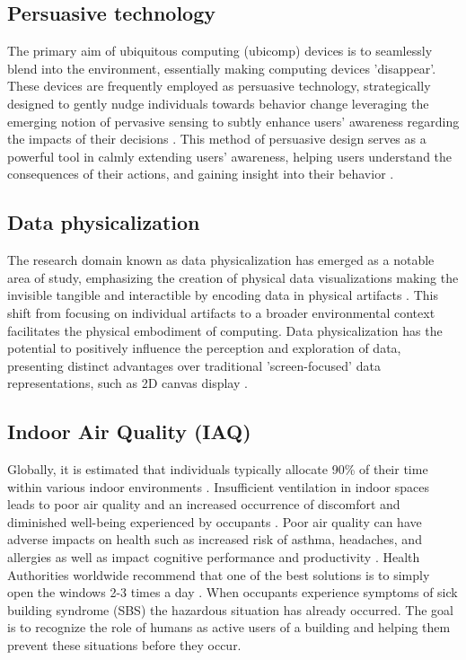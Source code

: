 \subsection{Persuasive technology}

The primary aim of ubiquitous computing (ubicomp) devices is to seamlessly blend into the environment, essentially making computing devices 'disappear'\cite{weiser}. These devices are frequently employed as persuasive technology, strategically designed to gently nudge individuals towards behavior change leveraging the emerging notion of pervasive sensing to subtly enhance users' awareness regarding the impacts of their decisions \cite{twinkly}. This method of persuasive design serves as a powerful tool in calmly extending users' awareness, helping users understand the consequences of their actions, and gaining insight into their behavior \cite{calm}.

\subsection{Data physicalization}

The research domain known as data physicalization has emerged as a notable area of study, emphasizing the creation of physical data visualizations making the invisible tangible and interactible by encoding data in physical artifacts \cite{tangible}. This shift from focusing on individual artifacts to a broader environmental context facilitates the physical embodiment of computing. Data physicalization has the potential to positively influence the perception and exploration of data, presenting distinct advantages over traditional 'screen-focused' data representations, such as 2D canvas display \cite{physicalization}.

\subsection{Indoor Air Quality (IAQ)}
Globally, it is estimated that individuals typically allocate 90\% of their time within various indoor environments \cite{indoor}. Insufficient ventilation in indoor spaces leads to poor air quality and an increased occurrence of discomfort and diminished well-being experienced by occupants \cite{ventilation}. Poor air quality can have adverse impacts on health such as increased risk of asthma, headaches, and allergies \cite{who} as well as impact cognitive performance and productivity \cite{productivity}. Health Authorities worldwide recommend that one of the best solutions is to simply open the windows 2-3 times a day \cite{eu}. When occupants experience symptoms of sick building syndrome (SBS) \cite{sbs} the hazardous situation has already occurred. The goal is to recognize the role of humans as active users of a building and helping them prevent these situations before they occur.

\newpage